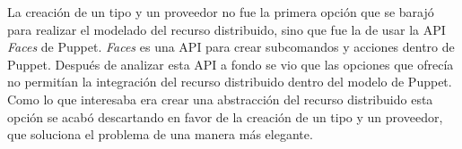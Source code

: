 La creación de un tipo y un proveedor no fue la primera opción que se barajó para realizar el modelado del recurso distribuido, sino que fue la de usar la API \emph{Faces} de Puppet. \emph{Faces} es una API para crear subcomandos y acciones dentro de Puppet. Después de analizar esta API a fondo se vio que las opciones que ofrecía no permitían la integración del recurso distribuido dentro del modelo de Puppet. Como lo que interesaba era crear una abstracción del recurso distribuido esta opción se acabó descartando en favor de la creación de un tipo y un proveedor, que soluciona el problema de una manera más elegante.
